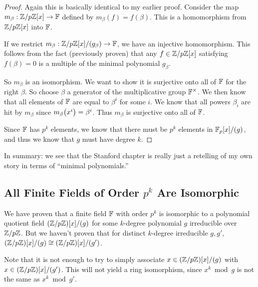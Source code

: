 \begin{proof}
  Again this is basically identical to my earlier proof. Consider the
  map $m_\beta: \mathbb{Z} / p\mathbb{Z}[x] \to \mathbb{F}$ defined by $m_\beta(f) = f(\beta)$.
  This is a homomorphism from $\mathbb{Z} / p\mathbb{Z}[x]$ into $\mathbb{F}$.

  If we restrict $m_\beta: \mathbb{Z} / p\mathbb{Z}[x]/(g_\beta) \to \mathbb{F}$, we have an
  injective homomorphism. This follows from the fact (previously proven)
  that any $f \in \mathbb{Z} / p\mathbb{Z}[x]$ satisfying $f(\beta) = 0$ is a multiple of
  the minimal polynomial $g_\beta$.

  So $m_\beta$ is an isomorphism. We want to show it is surjective onto
  all of $\mathbb{F}$ for the right $\beta$. So choose $\beta$ a generator of
  the multiplicative group $\mathbb{F}^\times$. We then know that all elements
  of $\mathbb{F}$ are equal to $\beta^i$ for some $i$. We know that all powers
  $\beta_i$ are hit by $m_\beta$ since $m_\beta\mathopen{}\left( {x^i} \right)\mathclose{} = \beta^i$.
  Thus $m_\beta$ is surjective onto all of $\mathbb{F}$.

  Since $\mathbb{F}$ has $p^k$ elements, we know that there must be $p^k$
  elements in $\mathbb{F}_p[x]/(g)$, and thus we know that $g$ must have degree $k$.
\end{proof}

\begin{remark}
  In summary: we see that the Stanford chapter is really just a
  retelling of my own story in terms of ``minimal polynomials.''
\end{remark}

\subsection{All Finite Fields of Order $p^k$ Are Isomorphic}

\begin{remark}
  We have proven that a finite field $\mathbb{F}$ with order $p^k$ is isomorphic
  to a polynomial quotient field $\mathopen{}\left( {\mathbb{Z} / p\mathbb{Z}} \right)\mathclose{}[x]/(g)$ for some
  $k$-degree polynomial $g$ irreducible over $\mathbb{Z} / p\mathbb{Z}$. But we haven't
  proven that for distinct $k$-degree irreducible $g, g'$,
  $\mathopen{}\left( {\mathbb{Z} / p\mathbb{Z}} \right)\mathclose{}[x]/(g) \cong \mathopen{}\left( {\mathbb{Z} / p\mathbb{Z}} \right)\mathclose{}[x]/(g')$.

  Note that it is not enough to try to simply associate $x \in
  \mathopen{}\left( {\mathbb{Z} / p\mathbb{Z}} \right)\mathclose{}[x]/(g)$ with $x \in \mathopen{}\left( {\mathbb{Z} / p\mathbb{Z}} \right)\mathclose{}[x]/(g')$. This
  will not yield a ring isomorphism, since $x^k \bmod g$ is not the same
  as $x^k \bmod g'$.
\end{remark}

